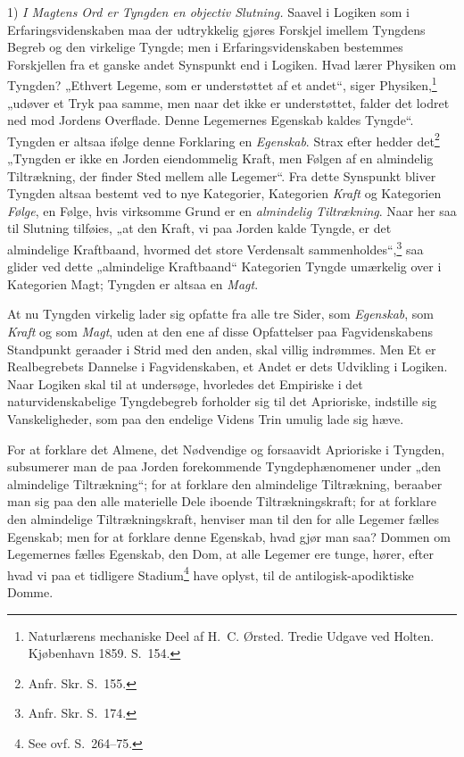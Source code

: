 \documentclass[12pt]{book}
\newcommand{\opage}[1]{\marginnote{\footnotesize\textit{[#1]}}}
\begin{document}
1) \emph{I Magtens Ord er Tyngden en objectiv Slutning.} Saavel i Logiken som i Erfaringsvidenskaben maa der udtrykkelig gjøres Forskjel imellem Tyngdens Begreb og den virkelige Tyngde; men i Erfaringsvidenskaben bestemmes Forskjellen fra et ganske andet Synspunkt end i Logiken. Hvad lærer Physiken om Tyngden? „Ethvert Legeme, som er understøttet af et andet“, siger Physiken,\footnote{Naturlærens mechaniske Deel af H.~C. Ørsted. Tredie Udgave ved Holten. Kjøbenhavn 1859. S.~154.}%
{} „udøver et Tryk paa samme, men naar det ikke er understøttet, falder det lodret ned mod Jordens Overflade. Denne Legemernes Egenskab kaldes Tyngde“. Tyngden er altsaa ifølge denne Forklaring en \emph{Egenskab}. Strax efter
\opage{410}hedder det\footnote{Anfr. Skr. S.~155.}%
{} „Tyngden er ikke en Jorden eiendommelig Kraft, men Følgen af en almindelig Tiltrækning, der finder Sted mellem alle Legemer“. Fra dette Synspunkt bliver Tyngden altsaa bestemt ved to nye Kategorier, Kategorien \emph{Kraft} og Kategorien \emph{Følge}, en Følge, hvis virksomme Grund er en \emph{almindelig Tiltrækning}. Naar her saa til Slutning tilføies, „at den Kraft, vi paa Jorden kalde Tyngde, er det almindelige Kraftbaand, hvormed det store Verdensalt sammenholdes“,\footnote{Anfr. Skr. S.~174.}%
{} saa glider ved dette „almindelige Kraftbaand“ Kategorien Tyngde umærkelig over i Kategorien Magt; Tyngden er altsaa en \emph{Magt}.

At nu Tyngden virkelig lader sig opfatte fra alle tre Sider, som \emph{Egenskab}, som \emph{Kraft} og som \emph{Magt}, uden at den ene af disse Opfattelser paa Fagvidenskabens Standpunkt geraader i Strid med den anden, skal villig indrømmes. Men Et er Realbegrebets Dannelse i Fagvidenskaben, et Andet er dets Udvikling i Logiken. Naar Logiken skal til at undersøge, hvorledes det Empiriske i det naturvidenskabelige Tyngdebegreb forholder sig til det Aprioriske, indstille sig Vanskeligheder, som paa den endelige Videns Trin umulig lade sig hæve.

For at forklare det Almene, det Nødvendige og forsaavidt Aprioriske i Tyngden, subsumerer man de paa Jorden forekommende Tyngdephænomener under „den almindelige Tiltrækning“; for at forklare den almindelige Tiltrækning, beraaber man sig paa den alle materielle Dele iboende Tiltrækningskraft; for at forklare den almindelige Tiltrækningskraft, henviser man til den for alle Legemer fælles Egenskab; men for at forklare denne Egenskab, hvad gjør man saa? Dommen om Legemernes fælles Egenskab, den Dom, at
\opage{411}alle Legemer ere tunge, hører, efter hvad vi paa et tidligere Stadium\footnote{See ovf. S.~264--75.}%
{} have oplyst, til de antilogisk-apodiktiske Domme.
\end{document}
